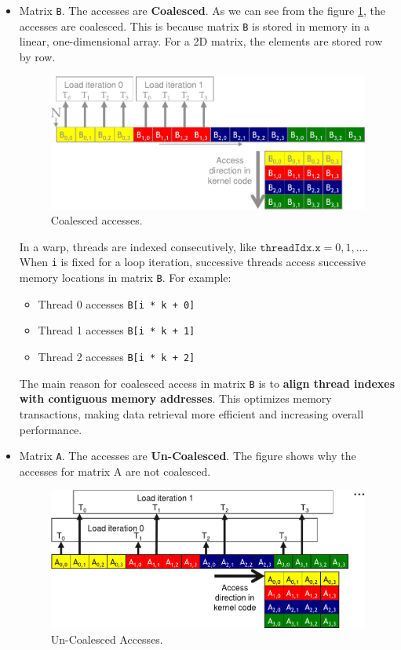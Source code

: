 \begin{itemize}
    \item Matrix \texttt{B}. The accesses are \textbf{Coalesced}. As we can see from the figure \ref{fig: coalesced accesses}, the accesses are coalesced. This is because matrix \texttt{B} is stored in memory in a linear, one-dimensional array. For a 2D matrix, the elements are stored row by row.

    \begin{figure}[!htp]
        \centering
        \includegraphics[width=\textwidth]{img/cuda-linear-memory-space-3.pdf}
        \caption{Coalesced accesses.}
        \label{fig: coalesced accesses}
    \end{figure}
  
    In a warp, threads are indexed consecutively, like $\texttt{threadIdx.x} = 0, 1, \dots$. When \texttt{i} is fixed for a loop iteration, successive threads access successive memory locations in matrix \texttt{B}. For example:
    \begin{itemize}
        \item Thread 0 accesses \texttt{B[i * k + 0]}
        \item Thread 1 accesses \texttt{B[i * k + 1]}
        \item Thread 2 accesses \texttt{B[i * k + 2]}
    \end{itemize}
    The main reason for coalesced access in matrix \texttt{B} is to \textbf{align thread indexes with contiguous memory addresses}. This optimizes memory transactions, making data retrieval more efficient and increasing overall performance.


    \item Matrix \texttt{A}. The accesses are \textbf{Un-Coalesced}. The figure shows why the accesses for matrix A are not coalesced.
    
    \begin{figure}[!htp]
        \centering
        \includegraphics[width=\textwidth]{img/cuda-linear-memory-space-4.pdf}
        \caption{Un-Coalesced Accesses.}
    \end{figure}


\end{itemize}

